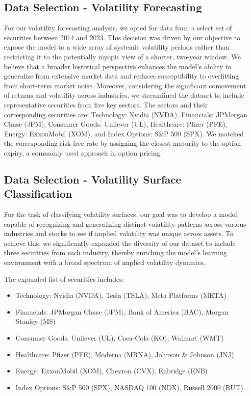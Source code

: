 \documentclass[10pt]{article}
\begin{document}
\subsection{Data Selection - Volatility Forecasting}
For our volatility forecasting analysis, we opted for data from a select set of securities between 2014 and 2023. This decision was driven by our objective to expose the model to a wide array of systemic volatility periods rather than restricting it to the potentially myopic view of a shorter, two-year window. We believe that a broader historical perspective enhances the model's ability to generalize from extensive market data and reduces susceptibility to overfitting from short-term market noise. Moreover, considering the significant comovement of returns and volatility across industries\cite{chan2007industry}, we streamlined the dataset to include representative securities from five key sectors. The sectors and their corresponding securities are: Technology: Nvidia (NVDA), Financials: JPMorgan Chase (JPM), Consumer Goods: Unilever (UL), Healthcare: Pfizer (PFE), Energy: ExxonMobil (XOM), and Index Options: S\&P 500 (SPX). We matched the corresponding risk-free rate by assigning the closest maturity to the option expiry, a commonly used approach in option pricing. 

\subsection{Data Selection - Volatility Surface Classification}
For the task of classifying volatility surfaces, our goal was to develop a model capable of recognizing and generalizing distinct volatility patterns across various industries and stocks to see if implied volatility was unique across assets. To achieve this, we significantly expanded the diversity of our dataset to include three securities from each industry, thereby enriching the model’s learning environment with a broad spectrum of implied volatility dynamics.

The expanded list of securities includes:
\begin{itemize}
    \item Technology: Nvidia (NVDA), Tesla (TSLA), Meta Platforms (META)
    \item Financials: JPMorgan Chase (JPM), Bank of America (BAC), Morgan Stanley (MS)
    \item Consumer Goods: Unilever (UL), Coca-Cola (KO), Walmart (WMT)
    \item Healthcare: Pfizer (PFE), Moderna (MRNA), Johnson \& Johnson (JNJ)
    \item Energy: ExxonMobil (XOM), Chevron (CVX), Enbridge (ENB)
    \item Index Options: S\&P 500 (SPX), NASDAQ 100 (NDX), Russell 2000 (RUT)
\end{itemize}
\end{document}
